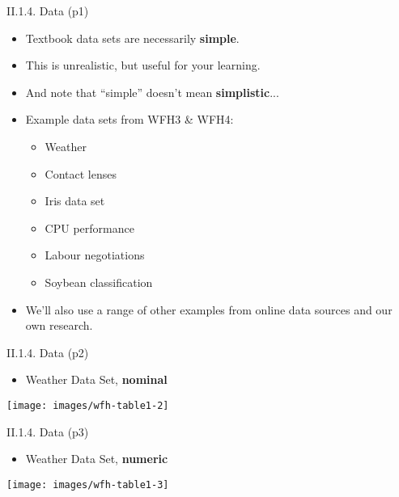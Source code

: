 \documentclass[handout]{beamer}
\newcommand{\strong}[1]{\textbf{\color{teal} #1}}
\newcommand{\stronger}[1]{\textbf{\color{purple} #1}}
\begin{document}
\begin{frame}{II.1.4. Data (p1)}
\begin{itemize}
\item Textbook data sets are necessarily \strong{simple}.
\item This is unrealistic, but useful for your learning.
\item And note that ``simple'' doesn't mean \strong{simplistic}...
\item Example data sets from WFH3 \& WFH4:
	\begin{itemize}
	\item Weather
	\item Contact lenses
	\item Iris data set
	\item CPU performance
	\item Labour negotiations
	\item Soybean classification
	\end{itemize}
\item We'll also use a range of other examples from online data sources and our own research.
\end{itemize}
\end{frame}
\begin{frame}{II.1.4. Data (p2)}
\begin{itemize}
\item Weather Data Set, \stronger{nominal}~\cite{WFH3:2011}
\end{itemize}
\begin{center}
\texttt{[image: images/wfh-table1-2]}
\cite[Table 1.2]{WFH3:2011}
\end{center}
\end{frame}
\begin{frame}{II.1.4. Data (p3)}
\begin{itemize}
\item Weather Data Set, \stronger{numeric}~\cite{WFH3:2011}
\end{itemize}
\begin{center}
\texttt{[image: images/wfh-table1-3]}
\cite[Table 1.3]{WFH3:2011}
\end{center}
\end{frame}
\end{document}
